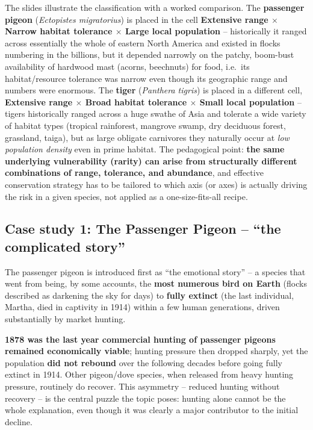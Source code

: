 \documentclass[11pt,a4paper]{article}
\begin{document}
\begin{keybox}[title={Diagram: locating the passenger pigeon and the tiger on the rarity grid}]
The slides illustrate the classification with a worked comparison. The \textbf{passenger pigeon} (\emph{Ectopistes migratorius}) is placed in the cell \textbf{Extensive range $\times$ Narrow habitat tolerance $\times$ Large local population} -- historically it ranged across essentially the whole of eastern North America and existed in flocks numbering in the billions, but it depended narrowly on the patchy, boom-bust availability of hardwood mast (acorns, beechnuts) for food, i.e.\ its habitat/resource tolerance was narrow even though its geographic range and numbers were enormous. The \textbf{tiger} (\emph{Panthera tigris}) is placed in a different cell, \textbf{Extensive range $\times$ Broad habitat tolerance $\times$ Small local population} -- tigers historically ranged across a huge swathe of Asia and tolerate a wide variety of habitat types (tropical rainforest, mangrove swamp, dry deciduous forest, grassland, taiga), but as large obligate carnivores they naturally occur at \emph{low population density} even in prime habitat. The pedagogical point: \textbf{the same underlying vulnerability (rarity) can arise from structurally different combinations of range, tolerance, and abundance}, and effective conservation strategy has to be tailored to which axis (or axes) is actually driving the risk in a given species, not applied as a one-size-fits-all recipe.
\end{keybox}

\subsection{Case study 1: The Passenger Pigeon -- ``the complicated story''}
The passenger pigeon is introduced first as ``the emotional story'' -- a species that went from being, by some accounts, the \textbf{most numerous bird on Earth} (flocks described as darkening the sky for days) to \textbf{fully extinct} (the last individual, Martha, died in captivity in 1914) within a few human generations, driven substantially by market hunting.

\begin{keybox}[title={The puzzle that makes it ``complicated,'' not just emotional}]
\textbf{1878 was the last year commercial hunting of passenger pigeons remained economically viable}; hunting pressure then dropped sharply, yet the population \textbf{did not rebound} over the following decades before going fully extinct in 1914. Other pigeon/dove species, when released from heavy hunting pressure, routinely do recover. This asymmetry -- reduced hunting without recovery -- is the central puzzle the topic poses: hunting alone cannot be the whole explanation, even though it was clearly a major contributor to the initial decline.
\end{keybox}
\end{document}
